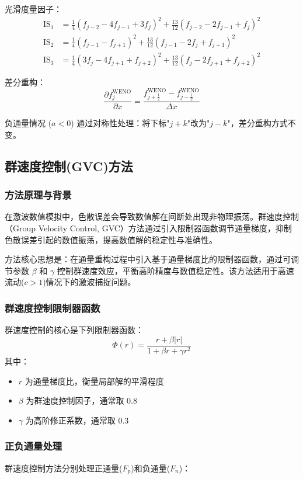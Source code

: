 \documentclass[12pt,a4paper]{article}
\begin{document}
光滑度量因子：
\begin{align}
\mathrm{IS}_1 &= \frac{1}{4}(f_{j-2} - 4f_{j-1} + 3f_j)^2 + \frac{13}{12}(f_{j-2} - 2f_{j-1} + f_j)^2 \\
\mathrm{IS}_2 &= \frac{1}{4}(f_{j-1} - f_{j+1})^2 + \frac{13}{12}(f_{j-1} - 2f_j + f_{j+1})^2 \\
\mathrm{IS}_3 &= \frac{1}{4}(3f_j - 4f_{j+1} + f_{j+2})^2 + \frac{13}{12}(f_j - 2f_{j+1} + f_{j+2})^2
\end{align}

差分重构：
\begin{equation}
\frac{\partial f_j^{\mathrm{WENO}}}{\partial x} = \frac{f_{j+\frac{1}{2}}^{\mathrm{WENO}} - f_{j-\frac{1}{2}}^{\mathrm{WENO}}}{\Delta x}
\end{equation}

负通量情况 ($a < 0$) 通过对称性处理：将下标"$j+k$"改为"$j-k$"，差分重构方式不变。

\subsection{群速度控制(GVC)方法}
\subsubsection{方法原理与背景}
在激波数值模拟中，色散误差会导致数值解在间断处出现非物理振荡。群速度控制（Group Velocity Control, GVC）方法通过引入限制器函数调节通量梯度，抑制色散误差引起的数值振荡，提高数值解的稳定性与准确性。

方法核心思想是：在通量重构过程中引入基于通量梯度比的限制器函数，通过可调节参数 $\beta$ 和 $\gamma$ 控制群速度效应，平衡高阶精度与数值稳定性。该方法适用于高速流动($c > 1$)情况下的激波捕捉问题。

\subsubsection{群速度控制限制器函数}
群速度控制的核心是下列限制器函数：
$$
\Phi(r) = \frac{r + \beta |r|}{1 + \beta r + \gamma r^2}
$$
其中：
\begin{itemize}
    \item $r$ 为通量梯度比，衡量局部解的平滑程度
    \item $\beta$ 为群速度控制因子，通常取 0.8
    \item $\gamma$ 为高阶修正系数，通常取 0.3
\end{itemize}


\subsubsection{正负通量处理}
群速度控制方法分别处理正通量($F_p$)和负通量($F_n$)：
\end{document}
